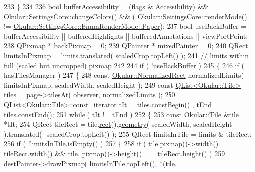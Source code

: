 \begin{DoxyCode}
233     \}
234 
236     \textcolor{keywordtype}{bool} bufferAccessibility = (flags & \hyperlink{classPagePainter_ae7f51ac72a598d2753cfc35ecdb51e01ac3c6879723c19935fb6fe250d0feca17}{Accessibility}) && 
      \hyperlink{classOkular_1_1SettingsCore_af01449e331a4e973d5cb3879a3e76081}{Okular::SettingsCore::changeColors}() && (
      \hyperlink{classOkular_1_1SettingsCore_a6fcb9ee5ad7a92b49ad31344771cca2d}{Okular::SettingsCore::renderMode}() != 
      \hyperlink{classOkular_1_1SettingsCore_1_1EnumRenderMode_aae172bdb345dda4d639e763709ea357aa58af23c7fbd8ea1998995a8eaffa125d}{Okular::SettingsCore::EnumRenderMode::Paper});
237     \textcolor{keywordtype}{bool} useBackBuffer = bufferAccessibility || bufferedHighlights || bufferedAnnotations || viewPortPoint;
238     QPixmap * backPixmap = 0;
239     QPainter * mixedPainter = 0;
240     QRect limitsInPixmap = limits.translated( scaledCrop.topLeft() );
241         \textcolor{comment}{// limits within full (scaled but uncropped) pixmap}
242 
244     \textcolor{keywordflow}{if} ( !useBackBuffer )
245     \{
246         \textcolor{keywordflow}{if} ( hasTilesManager )
247         \{
248             \textcolor{keyword}{const} \hyperlink{classOkular_1_1NormalizedRect}{Okular::NormalizedRect} normalizedLimits( limitsInPixmap, 
      scaledWidth, scaledHeight );
249             \textcolor{keyword}{const} \hyperlink{classQList}{QList<Okular::Tile>} tiles = page->\hyperlink{classOkular_1_1Page_a5dea3e142724e8c320b50bba420bd03b}{tilesAt}( observer, 
      normalizedLimits );
250             \hyperlink{classQList}{QList<Okular::Tile>::const\_iterator} tIt = tiles.constBegin()
      , tEnd = tiles.constEnd();
251             \textcolor{keywordflow}{while} ( tIt != tEnd )
252             \{
253                 \textcolor{keyword}{const} \hyperlink{classOkular_1_1Tile}{Okular::Tile} &tile = *tIt;
254                 QRect tileRect = tile.\hyperlink{classOkular_1_1Tile_af98992ebbaa390a12a942bff6c246fca}{rect}().\hyperlink{classOkular_1_1NormalizedRect_a006897c5fcff2c3a97b4141f1a967513}{geometry}( scaledWidth, scaledHeight ).translated( 
      -scaledCrop.topLeft() );
255                 QRect limitsInTile = limits & tileRect;
256                 \textcolor{keywordflow}{if} ( !limitsInTile.isEmpty() )
257                 \{
258                     \textcolor{keywordflow}{if} ( tile.\hyperlink{classOkular_1_1Tile_ad20431332cb0fb2844fa2238cc728a9f}{pixmap}()->width() == tileRect.width() && tile.
      \hyperlink{classOkular_1_1Tile_ad20431332cb0fb2844fa2238cc728a9f}{pixmap}()->height() == tileRect.height() )
259                         destPainter->drawPixmap( limitsInTile.topLeft(), *(tile.

\end{DoxyCode}
